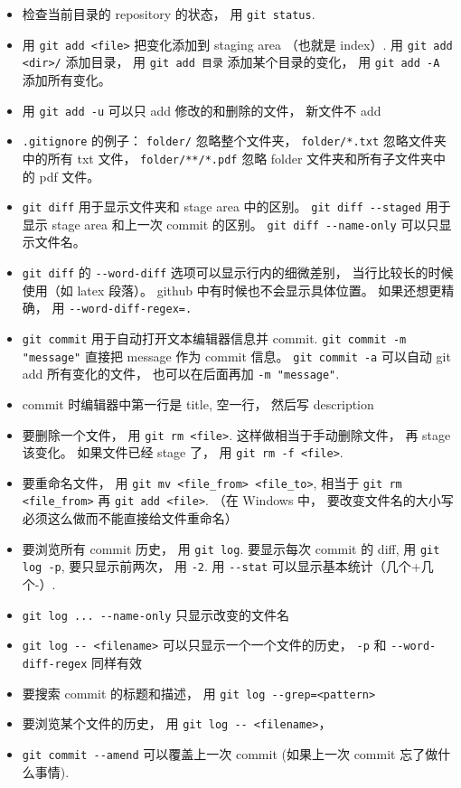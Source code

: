 \begin{itemize}
\item 检查当前目录的 repository 的状态， 用 \verb|git status|. 
\item 用 \verb|git add <file>| 把变化添加到 staging area （也就是 index）. 用 \verb|git add <dir>/| 添加目录， 用 \verb|git add 目录| 添加某个目录的变化， 用 \verb|git add -A| 添加所有变化。
\item 用 \verb|git add -u| 可以只 add 修改的和删除的文件， 新文件不 add
\item \verb|.gitignore| 的例子： \verb|folder/| 忽略整个文件夹， \verb|folder/*.txt| 忽略文件夹中的所有 txt 文件， \verb|folder/**/*.pdf| 忽略 folder 文件夹和所有子文件夹中的 pdf 文件。
\item \verb|git diff| 用于显示文件夹和 stage area 中的区别。 \verb|git diff --staged| 用于显示 stage area 和上一次 commit 的区别。 \verb|git diff --name-only| 可以只显示文件名。
\item \verb|git diff| 的 \verb|--word-diff| 选项可以显示行内的细微差别， 当行比较长的时候使用（如 latex 段落）。 github 中有时候也不会显示具体位置。 如果还想更精确， 用 \verb|--word-diff-regex=.|
\item \verb|git commit| 用于自动打开文本编辑器信息并 commit. \verb|git commit -m "message"| 直接把 message 作为 commit 信息。 \verb|git commit -a| 可以自动 git add 所有变化的文件， 也可以在后面再加 \verb|-m "message"|.
\item commit 时编辑器中第一行是 title, 空一行， 然后写 description
\item 要删除一个文件， 用 \verb|git rm <file>|. 这样做相当于手动删除文件， 再 stage 该变化。 如果文件已经 stage 了， 用 \verb|git rm -f <file>|.
\item 要重命名文件， 用 \verb|git mv <file_from> <file_to>|, 相当于 \verb|git rm <file_from>| 再 \verb|git add <file>|. （在 Windows 中， 要改变文件名的大小写必须这么做而不能直接给文件重命名）
\item 要浏览所有 commit 历史， 用 \verb|git log|. 要显示每次 commit 的 diff, 用 \verb|git log -p|, 要只显示前两次， 用 \verb|-2|. 用 \verb|--stat| 可以显示基本统计（几个+几个-）.
\item \verb|git log ... --name-only| 只显示改变的文件名
\item \verb|git log -- <filename>| 可以只显示一个一个文件的历史， \verb|-p| 和 \verb|--word-diff-regex| 同样有效
\item 要搜索 commit 的标题和描述， 用 \verb|git log --grep=<pattern>|
\item 要浏览某个文件的历史， 用 \verb|git log -- <filename>|， 
\item \verb|git commit --amend| 可以覆盖上一次 commit (如果上一次 commit 忘了做什么事情).

\end{itemize}
